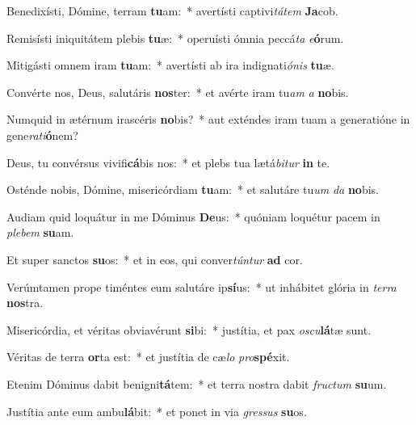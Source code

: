 \item Benedixísti, Dómine, terram \textbf{tu}am:~* avertísti captivi\textit{tá}\textit{tem} \textbf{Ja}cob.
\item Remisísti iniquitátem plebis \textbf{tu}æ:~* operuísti ómnia peccá\textit{ta} \textit{e}\textbf{ó}rum.
\item Mitigásti omnem iram \textbf{tu}am:~* avertísti ab ira indignati\textit{ó}\textit{nis} \textbf{tu}æ.
\item Convérte nos, Deus, salutáris \textbf{nos}ter:~* et avérte iram tu\textit{am} \textit{a} \textbf{no}bis.
\item Numquid in ætérnum irascéris \textbf{no}bis?~* aut exténdes iram tuam a generatióne in gene\textit{ra}\textit{ti}\textbf{ó}nem?
\item Deus, tu convérsus vivifi\textbf{cá}bis nos:~* et plebs tua lætá\textit{bi}\textit{tur} \textbf{in} te.
\item Osténde nobis, Dómine, misericórdiam \textbf{tu}am:~* et salutáre tu\textit{um} \textit{da} \textbf{no}bis.
\item Audiam quid loquátur in me Dóminus \textbf{De}us:~* quóniam loquétur pacem in \textit{ple}\textit{bem} \textbf{su}am.
\item Et super sanctos \textbf{su}os:~* et in eos, qui conver\textit{tún}\textit{tur} \textbf{ad} cor.
\item Verúmtamen prope timéntes eum salutáre ip\textbf{sí}us:~* ut inhábitet glória in \textit{ter}\textit{ra} \textbf{nos}tra.
\item Misericórdia, et véritas obviavérunt \textbf{si}bi:~* justítia, et pax \textit{os}\textit{cu}\textbf{lá}tæ sunt.
\item Véritas de terra \textbf{or}ta est:~* et justítia de cæ\textit{lo} \textit{pro}\textbf{spé}xit.
\item Etenim Dóminus dabit benigni\textbf{tá}tem:~* et terra nostra dabit \textit{fruc}\textit{tum} \textbf{su}um.
\item Justítia ante eum ambu\textbf{lá}bit:~* et ponet in via \textit{gres}\textit{sus} \textbf{su}os.
